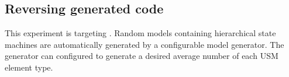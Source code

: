 \subsection{Reversing generated code}
This experiment is targeting . Random models containing hierarchical state machines are automatically generated by a configurable model generator. The generator can configured to generate a desired average number of each USM element type. 

